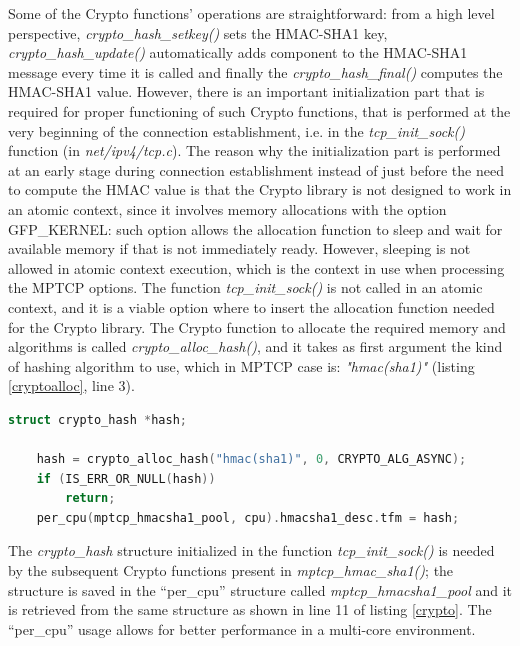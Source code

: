 Some of the Crypto functions' operations are straightforward: from a high level perspective, \textit{crypto\_hash\_setkey()} sets the HMAC-SHA1 key, \textit{crypto\_hash\_update()} automatically adds component to the HMAC-SHA1 message every time it is called and finally the \textit{crypto\_hash\_final()} computes the HMAC-SHA1 value.
However, there is an important initialization part that is required for proper functioning of such Crypto functions, that is performed at the very beginning of the connection establishment, i.e. in the \textit{tcp\_init\_sock()} function (in \textit{net/ipv4/tcp.c}). The reason why the initialization part is performed at an early stage during connection establishment instead of just before the need to compute the HMAC value is that the Crypto library is not designed to work in an atomic context, since it involves memory allocations with the option GFP\_KERNEL: such option allows the allocation function to sleep and wait for available memory if that is not immediately ready. However, sleeping is not allowed in atomic context execution, which is the context in use when processing the MPTCP options. The function \textit{tcp\_init\_sock()} is not called in an atomic context, and it is a viable option where to insert the allocation function needed for the Crypto library. The Crypto function to allocate the required memory and algorithms is called \textit{crypto\_alloc\_hash()}, and it takes as first argument the kind of hashing algorithm to use, which in MPTCP case is: \textit{"hmac(sha1)"} (listing \ref{cryptoalloc}, line 3).

\begin{lstlisting}[language=c, caption=Initializing the Crypto-API framework in \textit{tcp\_init\_sock()}, label=cryptoalloc]
	struct crypto_hash *hash;

	hash = crypto_alloc_hash("hmac(sha1)", 0, CRYPTO_ALG_ASYNC);
	if (IS_ERR_OR_NULL(hash))
		return;
	per_cpu(mptcp_hmacsha1_pool, cpu).hmacsha1_desc.tfm = hash;
\end{lstlisting}

The \textit{crypto\_hash} structure initialized in the function \textit{tcp\_init\_sock()} is needed by the subsequent Crypto functions present in \textit{mptcp\_hmac\_sha1()}; the structure is saved in the ``per\_cpu'' structure called \textit{mptcp\_hmacsha1\_pool} and it is retrieved from the same structure as shown in line 11 of listing \ref{crypto}. The ``per\_cpu'' usage allows for better performance in a multi-core environment.

